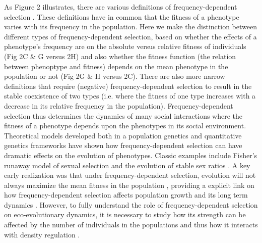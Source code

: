 \documentclass{article}
\begin{document}
 As Figure 2 illustrates, there are various definitions of frequency-dependent selection \citep{Heino1998}. These definitions have in common that the fitness of a phenotype varies with its frequency in the population. Here we make the distinction between different types of frequency-dependent selection, based on whether the effects of a phenotype's frequency are on the absolute versus relative fitness of individuals (Fig 2C \& G versus 2H) and also whether the fitness function (the relation between phenoptype and fitness) depends on the mean phenotype in the population or not (Fig 2G \& H versus 2C). There are also more narrow definitions that require (negative) frequency-dependent selection to result in the stable coexistence of two types (i.e. where the fitness of one type increases with a decrease in its relative frequency in the population). Frequency-dependent selection thus determines the dynamics of many social interactions where the fitness of a phenotype depends upon the phenotypes in its social environment. Theoretical models developed both in a population genetics \citep{Wright1969} and quantitative genetics \citep{Lande2007, Engen2020} frameworks have shown how frequency-dependent selection can have dramatic effects on the evolution of phenotypes. Classic examples include Fisher's runaway model of sexual selection and the evolution of stable sex ratios \citep{Fisher1930}. A key early realization was that under frequency-dependent selection, evolution will not always maximize the mean fitness in the population \citep{Wright1969}, providing a explicit link on how frequency-dependent selection affects population growth and its long term dynamics \citep{Svensson2018}. However, to fully understand the role of frequency-dependent selection on eco-evolutionary dynamics, it is necessary to study how its strength can be affected by the number of individuals in the populations and thus how it interacts with density regulation \citep{Anderson1971, Matessi1976, Asmussen1983, Heino1998, Joshi2001, Engen2020}. 
 
\end{document}
